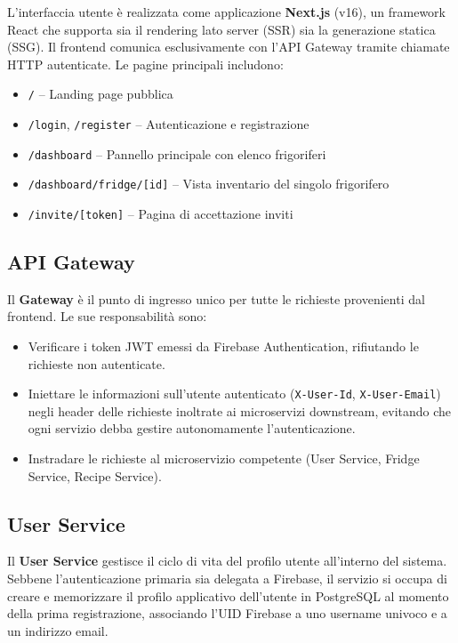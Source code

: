 \documentclass[12pt,a4paper,twoside]{report}
\begin{document}
L'interfaccia utente è realizzata come applicazione \textbf{Next.js} (v16), un framework React che supporta sia il rendering lato server (SSR) sia la generazione statica (SSG). Il frontend comunica esclusivamente con l'API Gateway tramite chiamate HTTP autenticate. Le pagine principali includono:
\begin{itemize}
  \item \texttt{/} -- Landing page pubblica
  \item \texttt{/login}, \texttt{/register} -- Autenticazione e registrazione
  \item \texttt{/dashboard} -- Pannello principale con elenco frigoriferi
  \item \texttt{/dashboard/fridge/[id]} -- Vista inventario del singolo frigorifero
  \item \texttt{/invite/[token]} -- Pagina di accettazione inviti
\end{itemize}

\subsection{API Gateway}

Il \textbf{Gateway} è il punto di ingresso unico per tutte le richieste provenienti dal frontend. Le sue responsabilità sono:
\begin{itemize}
  \item Verificare i token JWT emessi da Firebase Authentication, rifiutando le richieste non autenticate.
  \item Iniettare le informazioni sull'utente autenticato (\texttt{X-User-Id}, \texttt{X-User-Email}) negli header delle richieste inoltrate ai microservizi downstream, evitando che ogni servizio debba gestire autonomamente l'autenticazione.
  \item Instradare le richieste al microservizio competente (User Service, Fridge Service, Recipe Service).
\end{itemize}

\subsection{User Service}

Il \textbf{User Service} gestisce il ciclo di vita del profilo utente all'interno del sistema. Sebbene l'autenticazione primaria sia delegata a Firebase, il servizio si occupa di creare e memorizzare il profilo applicativo dell'utente in PostgreSQL al momento della prima registrazione, associando l'UID Firebase a uno username univoco e a un indirizzo email.
\end{document}
